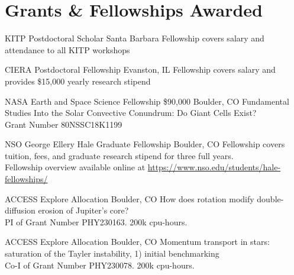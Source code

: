 \section{Grants \& Fellowships Awarded}


		{KITP Postdoctoral Scholar}
		{}
		{Santa Barbara}
		{}
		{Fellowship covers salary and attendance to all KITP workshops}

		{CIERA Postdoctoral Fellowship}
		{}
		{Evanston, IL}
		{}
		{Fellowship covers salary and provides \$15,000 yearly research stipend}

		{NASA Earth and Space Science Fellowship}
		{\$90,000}
		{Boulder, CO}
		{}
		{Fundamental Studies Into the Solar Convective Conundrum: Do Giant Cells Exist?\\
		 Grant Number 80NSSC18K1199}

		{NSO George Ellery Hale Graduate Fellowship}
		{}
		{Boulder, CO}
		{}
		{Fellowship covers tuition, fees, and graduate research stipend for three full years.\\
		 Fellowship overview available online at \href{https://www.nso.edu/students/hale-fellowships/}{https://www.nso.edu/students/hale-fellowships/}}


		{ACCESS Explore Allocation}
		{}
		{Boulder, CO}
		{}
		{How does rotation modify double-diffusion erosion of Jupiter's core?\\
        PI of Grant Number PHY230163. 200k cpu-hours.}

\cventry{}
		{ACCESS Explore Allocation}
		{}
		{Boulder, CO}
		{}
		{Momentum transport in stars: saturation of the Tayler instability, 1) initial benchmarking\\
        Co-I of Grant Number PHY230078. 200k cpu-hours.}


